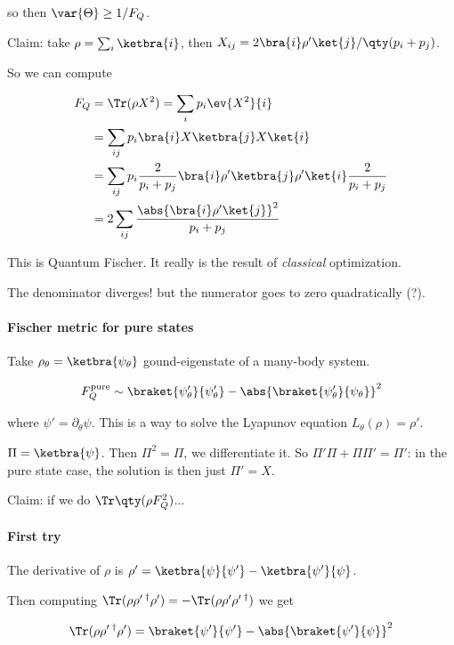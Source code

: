 so then \( \var{\Theta} \geq 1/F_Q \).

Claim: take \( \rho = \sum_i \ketbra{i} \), then \( X _{ij} = 2\bra{i}\rho' \ket{j}/\qty(p_i + p_j) \).

So we can compute

\begin{align}
  F_Q &= \Tr(\rho X^2) = \sum_i p_i \ev{X^2}{i}  \\
  &= \sum _{ij} p_i \bra{i} X \ketbra{j} X \ket{i}  \\
  &= \sum _{ij} p_i \frac{2}{p_i + p_j} \bra{i} \rho' \ketbra{j} \rho' \ket{i} \frac{2}{p_i + p_j}  \\
  &= 2 \sum _{ij} \frac{\abs{\bra{i} \rho' \ket{j}}^2 }{p_i + p_j}
\end{align}

This is Quantum Fischer. It really is the result of \emph{classical} optimization.

The denominator diverges! but the numerator goes to zero quadratically (?).

\paragraph{Fischer metric for pure states}

Take \( \rho_\theta = \ketbra{\psi_\theta} \) gound-eigenstate of a many-body system.

\begin{equation}
  F_Q ^{\text{pure}} \sim \braket{\psi_\theta'}{\psi_\theta'} - \abs{\braket{\psi_\theta'}{\psi_\theta}}^2
\end{equation}

where \( \psi' = \partial_\theta \psi \). This is a way to solve the Lyapunov equation \( L_\theta (\rho) = \rho' \).

\( \Pi = \ketbra{\psi} \). Then \(\Pi ^2 = \Pi\), we differentiate it.
So \( \Pi' \Pi + \Pi \Pi' = \Pi' \): in the pure state case, the solution is then just \( \Pi ' = X \).

Claim: if we do \( \Tr \qty(\rho F_Q^2)\)...

\paragraph{First try}

The derivative of \( \rho \) is \( \rho' = \ketbra{\psi}{\psi'} - \ketbra{\psi'}{\psi} \).

Then computing \( \Tr(\rho \rho'\, ^\dag \rho') = - \Tr(\rho \rho' \rho'\, ^\dag)\) we get

\begin{equation}
  \Tr(\rho \rho'\, ^\dag \rho') = \braket{\psi'}{\psi'} - \abs{\braket{\psi'}{\psi}}^2
\end{equation}
